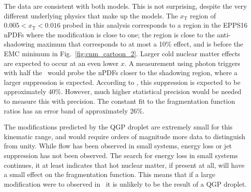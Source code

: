 The data are consistent with both models. This is not surprising, despite the very different underlying physics that make up the models. The $x_\mathrm{T}$ region of  $0.005 < x_\mathrm{T} < 0.016$ probed in this analysis corresponds to a region in the EPPS16 nPDFs where the modification is close to one; the region is close to the anti-shadowing maximum that corresponds to at most a 10\% effect, and is before the EMC minimum in Fig.~\ref{fig:cnm_cartoon_2}. Larger cold nuclear matter effects are expected to occur at an even lower $x$. A measurement using photon triggers with half the \pt~would probe the nPDFs closer to the shadowing region, where a larger suppression is expected. According to \cite{epps16:2017}, this suppression is expected to be approximately 40\%. However, much higher statistical precision would be needed to measure this with precision. The constant fit to the fragmentation function ratios has an error band of approximately 26\%.

The modifications predicted by the QGP droplet are extremely small for this kinematic range, and would require orders of magnitude more data to distinguish from unity. While flow has been observed in small systems, energy loss or jet suppression has not been observed. The search for energy loss in small systems continues, it at least indicates that hot nuclear matter, if present at all, will have a small effect on the fragmentation function. This means that if a large modification were to observed in \pPb~it is unlikely to be the result of a QGP droplet.

